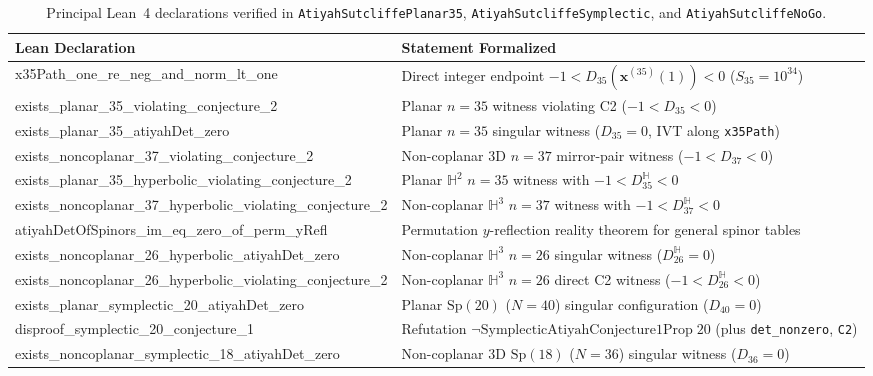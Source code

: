 \documentclass[11pt,reqno]{amsart}
\theoremstyle{remark}
\newcommand{\Hy}{\mathbb{H}}
\begin{document}
\begin{table}[htbp]
\centering
\scriptsize
\setlength{\tabcolsep}{4pt}
\renewcommand{\arraystretch}{0.92}
\caption{Principal Lean~4 declarations verified in \texttt{AtiyahSutcliffePlanar35}, \texttt{AtiyahSutcliffeSymplectic}, and \texttt{AtiyahSutcliffeNoGo}.}
\label{tab:lean-theorems-2}
\begin{tabular}{>{\ttfamily\raggedright\arraybackslash}p{}>{\raggedright\arraybackslash}p{}}
\toprule
\textrm{Lean Declaration} & Statement Formalized \\
\midrule
x35Path\_one\_re\_neg\_and\_norm\_lt\_one & Direct integer endpoint $-1 < D_{35}(\mathbf{x}^{(35)}(1)) < 0$ ($S_{35}=10^{34}$) \\
exists\_planar\_35\_violating\_conjecture\_2 & Planar $n = 35$ witness violating C2 ($-1 < D_{35} < 0$) \\
exists\_planar\_35\_atiyahDet\_zero & Planar $n = 35$ singular witness ($D_{35} = 0$, IVT along \texttt{x35Path}) \\
exists\_noncoplanar\_37\_violating\_conjecture\_2 & Non-coplanar 3D $n = 37$ mirror-pair witness ($-1 < D_{37} < 0$) \\
exists\_planar\_35\_hyperbolic\_violating\_conjecture\_2 & Planar $\Hy^2$ $n = 35$ witness with $-1 < D_{35}^{\Hy} < 0$ \\
exists\_noncoplanar\_37\_hyperbolic\_violating\_conjecture\_2 & Non-coplanar $\Hy^3$ $n = 37$ witness with $-1 < D_{37}^{\Hy} < 0$ \\
atiyahDetOfSpinors\_im\_eq\_zero\_of\_perm\_yRefl & Permutation $y$-reflection reality theorem for general spinor tables \\
exists\_noncoplanar\_26\_hyperbolic\_atiyahDet\_zero & Non-coplanar $\Hy^3$ $n = 26$ singular witness ($D_{26}^{\Hy} = 0$) \\
exists\_noncoplanar\_26\_hyperbolic\_violating\_conjecture\_2 & Non-coplanar $\Hy^3$ $n = 26$ direct C2 witness ($-1 < D_{26}^{\Hy} < 0$) \\
exists\_planar\_symplectic\_20\_atiyahDet\_zero & Planar $\mathrm{Sp}(20)$ ($N = 40$) singular configuration ($D_{40} = 0$) \\
disproof\_symplectic\_20\_conjecture\_1 & Refutation $\neg \mathrm{Symplectic\allowbreak Atiyah\allowbreak Conjecture1Prop}\; 20$ (plus \texttt{det\_nonzero}, \texttt{C2}) \\
exists\_noncoplanar\_symplectic\_18\_atiyahDet\_zero & Non-coplanar 3D $\mathrm{Sp}(18)$ ($N = 36$) singular witness ($D_{36} = 0$) \\

\end{tabular}
\end{table}
\end{document}
